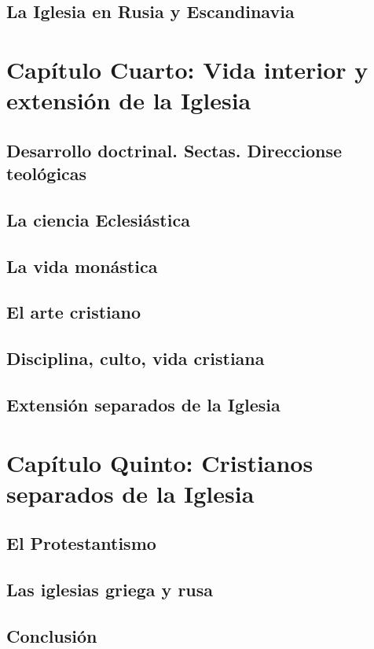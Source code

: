 \raggedbottom{} \documentclass[12pt, a4paper]{book}
\begin{document}
\section{La Iglesia en Rusia y Escandinavia}
\chapter{Capítulo Cuarto: Vida interior y extensión de la Iglesia}
\section{Desarrollo doctrinal. Sectas. Direccionse teológicas}
\section{La ciencia Eclesiástica}
\section{La vida monástica}
\section{El arte cristiano}
\section{Disciplina, culto, vida cristiana}
\section{Extensión separados de la Iglesia}
\chapter{Capítulo Quinto: Cristianos separados de la Iglesia}
\section{El Protestantismo}
\section{Las iglesias griega y rusa}
\section{Conclusión}
\end{document}
